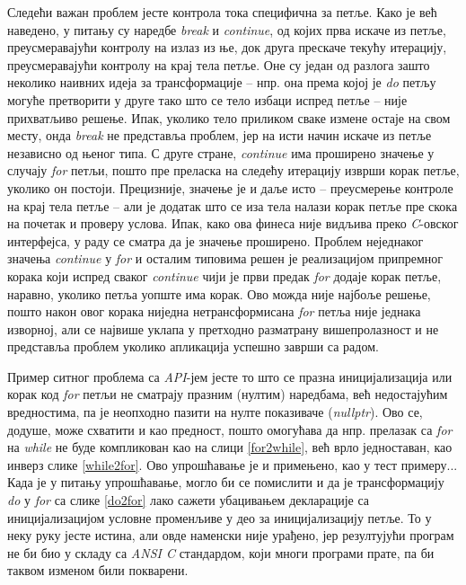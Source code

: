 \documentclass[a4paper]{article}
\begin{document}
Следећи важан проблем јесте контрола тока специфична за петље. Како је већ наведено, у питању су наредбе \textit{break} и \textit{continue}, од којих прва искаче из петље, преусмеравајући контролу на излаз из ње, док друга прескаче текућу итерацију, преусмеравајући контролу на крај тела петље. Оне су један од разлога зашто неколико наивних идеја за трансформације -- нпр. она према којој је \textit{do} петљу могуће претворити у друге тако што се тело избаци испред петље -- није прихватљиво решење. Ипак, уколико тело приликом сваке измене остаје на свом месту, онда \textit{break} не представља проблем, јер на исти начин искаче из петље независно од њеног типа. С друге стране, \textit{continue} има проширено значење у случају \textit{for} петљи, пошто пре преласка на следећу итерацију изврши корак петље, уколико он постоји. Прецизније, значење је и даље исто -- преусмерење контроле на крај тела петље -- али је додатак што се иза тела налази корак петље пре скока на почетак и проверу услова. Ипак, како ова финеса није видљива преко \textit{C}-овског интерфејса, у раду се сматра да је значење проширено. Проблем неједнаког значења \textit{continue} у \textit{for} и осталим типовима решен је реализацијом припремног корака који испред сваког \textit{continue} чији је први предак \textit{for} додаје корак петље, наравно, уколико петља уопште има корак. Ово можда није најбоље решење, пошто након овог корака ниједна нетрансформисана \textit{for} петља није једнака изворној, али се највише уклапа у претходно разматрану вишепролазност и не представља проблем уколико апликација успешно заврши са радом.

Пример ситног проблема са \textit{API}-јем јесте то што се празна иницијализација или корак код \textit{for} петљи не сматрају празним (нултим) наредбама, већ недостајућим вредностима, па је неопходно пазити на нулте показиваче (\textit{nullptr}). Ово се, додуше, може схватити и као предност, пошто омогућава да нпр. прелазак са \textit{for} на \textit{while} не буде компликован као на слици \ref{for2while}, већ врло једноставан, као инверз слике \ref{while2for}. Ово упрошћавање је и примењено, као у тест примеру... Када је у питању упрошћавање, могло би се помислити и да је трансформацију \textit{do} у \textit{for} са слике \ref{do2for} лако сажети убацивањем декларације са иницијализацијом условне променљиве у део за иницијализацију петље. То у неку руку јесте истина, али овде наменски није урађено, јер резултујући програм не би био у складу са \textit{ANSI C} стандардом, који многи програми прате, па би таквом изменом били покварени.
\end{document}

